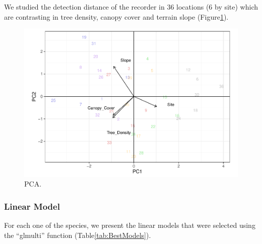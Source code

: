 \documentclass[fleqn,10pt,lineno]{wlpeerj} %
\begin{document}
We studied the detection distance of the recorder in 36 locations (6 by site) which are contrasting
in tree density, canopy cover and terrain slope (Figure\ref{fig:PCAplot}).

\begin{figure}

{\centering \includegraphics[width=1\linewidth]{ASR_MyPaper_2020_files/figure-latex/PCAplot-1} 

}

\caption{PCA.\label{fig:PCAplot}}\label{fig:PCAplot}
\end{figure}

\hypertarget{linear-model}{%
\subsubsection*{Linear Model}\label{linear-model}}

For each one of the species, we present the linear models that were selected using the ``glmulti'' function (Table\ref{tab:BestModels}).
\end{document}
